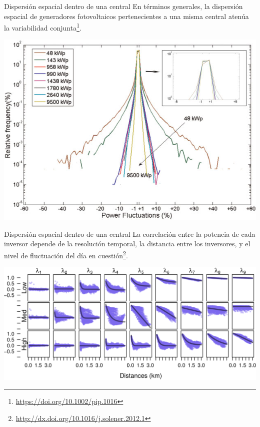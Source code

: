 \documentclass[aspectratio=169, usenames,svgnames,dvipsnames]{beamer}
\begin{document}
\begin{frame}[label={sec:orga2ccbc5}]{Dispersión espacial dentro de una central}
En términos generales, la \alert{dispersión espacial} de generadores
fotovoltaicos pertenecientes a \alert{una misma central} \alert{atenúa} la
variabilidad conjunta\footnote{\url{https://doi.org/10.1002/pip.1016}}.

\begin{center}
\includegraphics[height=0.7\textheight]{../figs/Variabilidad_DispersionGeografica_Planta.png}
\end{center}
\end{frame}

\begin{frame}[label={sec:org8b40608}]{Dispersión espacial dentro de una central}
La correlación entre la potencia de cada inversor \alert{depende} de la \alert{resolución temporal}, la \alert{distancia} entre los inversores, y el \alert{nivel de fluctuación del día} en cuestión\footnote{\url{http://dx.doi.org/10.1016/j.solener.2012.1}}.

\begin{center}
\includegraphics[height=0.6\textheight]{../figs/corDistMatrix_nls.png}
\end{center}
\end{frame}
\end{document}
